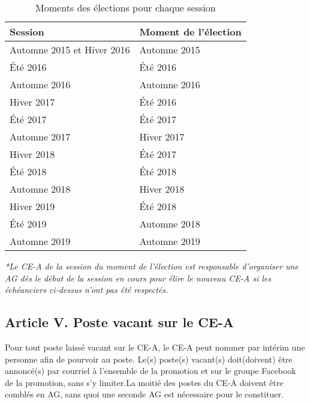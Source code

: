 \begin{table}[H]
    \centering
    \caption{Moments des élections pour chaque session}
    \begin{tabular}{|l|l|}
      \hline
      Session & Moment de l'élection \\
      \hline
      Automne 2015 et Hiver 2016 & Automne 2015 \\
      \hline
      Été 2016 & Été 2016 \\
      \hline
      Automne 2016 & Automne 2016 \\
      \hline
      Hiver 2017 & Été 2016 \\
      \hline
      Été 2017 & Été 2017 \\
      \hline
      Automne 2017 & Hiver 2017 \\
      \hline
      Hiver 2018 & Été 2017 \\
      \hline
      Été 2018 & Été 2018 \\
      \hline
      Automne 2018 & Hiver 2018 \\
      \hline
      Hiver 2019 & Été 2018 \\
      \hline
      Été 2019 & Automne 2018 \\
      \hline
      Automne 2019 & Automne 2019 \\
      \hline
    \end{tabular}
\end{table}

\textit{*Le CE-A de la session du moment de l'élection est responsable d'organiser une AG dès le début de la session en cours pour élire le nouveau CE-A si les échéanciers ci-dessus n'ont pas été respectés.}

\subsection*{Article V. Poste vacant sur le CE-A}
Pour tout poste laissé vacant sur le CE-A, le CE-A peut nommer par intérim une personne afin de pourvoir au poste. Le(s) poste(s) vacant(s) doit(doivent) être annoncé(s) par courriel à l'ensemble de la promotion et sur le groupe Facebook de la promotion, sans s’y limiter.La moitié des postes du CE-A doivent être comblés en AG, sans quoi une seconde AG est nécessaire pour le constituer.

